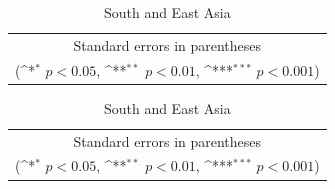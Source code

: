 \documentclass[10pt,a4paper]{scrartcl}
\begin{document}
\begin{table}[!ht]\centering
	\footnotesize
	\renewcommand{\arraystretch}{1.1}
	\def\sym#1{\ifmmode^{#1}\else\(^{#1}\)\fi}
	\caption{Subsidiary Protection Rate: Predicted Pattern}
	\begin{subtable}{.5\linewidth}
		\centering
		\caption{Europe and Central Asia}
		\begin{tabular}{l*{2}{c}}
			\hline\hline
			
			\hline\hline
			\multicolumn{3}{c}{\footnotesize Standard errors in parentheses} \\
			\multicolumn{3}{c}{\footnotesize (\sym{*} \(p<0.05\), \sym{**} \(p<0.01\), \sym{***} \(p<0.001\))}\\
		\end{tabular}
	\end{subtable}%
	\begin{subtable}{.5\linewidth}
		\centering
		\caption{South and East Asia}
		\begin{tabular}{l*{2}{c}}
			\hline\hline
			
			\hline\hline
			\multicolumn{3}{c}{\footnotesize Standard errors in parentheses} \\
			\multicolumn{3}{c}{\footnotesize (\sym{*} \(p<0.05\), \sym{**} \(p<0.01\), \sym{***} \(p<0.001\))}\\
		\end{tabular}
	\end{subtable}%
\end{table}
\end{document}
